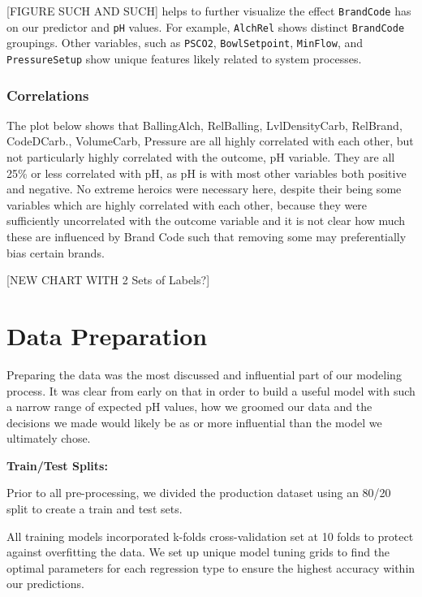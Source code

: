 \documentclass[]{report}
\begin{document}
{[}FIGURE SUCH AND SUCH{]} helps to further visualize the effect
\texttt{BrandCode} has on our predictor and \texttt{pH} values. For
example, \texttt{AlchRel} shows distinct \texttt{BrandCode} groupings.
Other variables, such as \texttt{PSCO2}, \texttt{BowlSetpoint},
\texttt{MinFlow}, and \texttt{PressureSetup} show unique features likely
related to system processes.

\hypertarget{correlations}{%
\subsection{Correlations}\label{correlations}}

The plot below shows that BallingAlch, RelBalling, LvlDensityCarb,
RelBrand, CodeDCarb., VolumeCarb, Pressure are all highly correlated
with each other, but not particularly highly correlated with the
outcome, pH variable. They are all 25\% or less correlated with pH, as
pH is with most other variables both positive and negative. No extreme
heroics were necessary here, despite their being some variables which
are highly correlated with each other, because they were sufficiently
uncorrelated with the outcome variable and it is not clear how much
these are influenced by Brand Code such that removing some may
preferentially bias certain brands.

{[}NEW CHART WITH 2 Sets of Labels?{]}

\hypertarget{data-preparation}{%
\chapter{Data Preparation}\label{data-preparation}}

Preparing the data was the most discussed and influential part of our
modeling process. It was clear from early on that in order to build a
useful model with such a narrow range of expected pH values, how we
groomed our data and the decisions we made would likely be as or more
influential than the model we ultimately chose.

\textbf{Train/Test Splits:}

Prior to all pre-processing, we divided the production dataset using an
80/20 split to create a train and test sets.

All training models incorporated k-folds cross-validation set at 10
folds to protect against overfitting the data. We set up unique model
tuning grids to find the optimal parameters for each regression type to
ensure the highest accuracy within our predictions.
\end{document}
